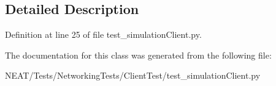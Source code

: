 \subsection{Detailed Description}


Definition at line 25 of file test\+\_\+simulation\+Client.\+py.



The documentation for this class was generated from the following file\+:\begin{DoxyCompactItemize}
\item 
N\+E\+A\+T/\+Tests/\+Networking\+Tests/\+Client\+Test/test\+\_\+simulation\+Client.\+py\end{DoxyCompactItemize}
